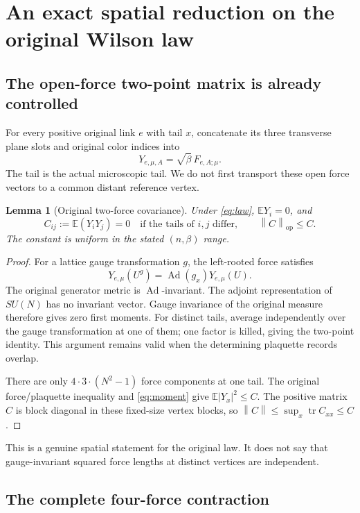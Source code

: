 \documentclass[11pt,letterpaper]{article}
\newtheorem{lemma}[theorem]{Lemma}
\theoremstyle{remark}\newtheorem{remark}[theorem]{Remark}
\newcommand{\E}{\mathbb E}
\newcommand{\tr}{\operatorname{tr}}\newcommand{\Tr}{\operatorname{Tr}}
\newcommand{\Ad}{\operatorname{Ad}}\newcommand{\diver}{\operatorname{div}}
\newcommand{\norm}[1]{\left\lVert#1\right\rVert}
\begin{document}
\section{An exact spatial reduction on the original Wilson law}

\subsection{The open-force two-point matrix is already controlled}

For every positive original link \(e\) with tail \(x\), concatenate its three transverse plane slots and original color indices into
\[
 Y_{e,\mu,A}=\sqrt\beta\,F_{e,A;\mu}.
\]
The tail is the actual microscopic tail. We do not first transport these open force vectors to a common distant reference vertex.

\begin{lemma}[Original two-force covariance]\label{lem:originalC}
Under \eqref{eq:law}, \(\E Y_i=0\), and
\[
 C_{ij}:=\E(Y_iY_j)=0\quad\text{if the tails of \(i,j\) differ},
 \qquad \norm C_{\mathrm{op}}\le C.
\]
The constant is uniform in the stated \((n,\beta)\) range.
\end{lemma}
\begin{proof}
For a lattice gauge transformation \(g\), the left-rooted force satisfies
\[
 Y_{e,\mu}(U^g)=\Ad(g_x)Y_{e,\mu}(U).
\]
The original generator metric is \(\Ad\)-invariant. The adjoint representation of \(SU(N)\) has no invariant vector. Gauge invariance of the original measure therefore gives zero first moments. For distinct tails, average independently over the gauge transformation at one of them; one factor is killed, giving the two-point identity. This argument remains valid when the determining plaquette records overlap.

There are only \(4\cdot3\cdot(N^2-1)\) force components at one tail. The original force/plaquette inequality and \eqref{eq:moment} give \(\E|Y_x|^2\le C\). The positive matrix \(C\) is block diagonal in these fixed-size vertex blocks, so
\(\norm C\le\sup_x\tr C_{xx}\le C\).
\end{proof}

This is a genuine spatial statement for the original law. It does not say that gauge-invariant squared force lengths at distinct vertices are independent.

\subsection{The complete four-force contraction}
\end{document}

